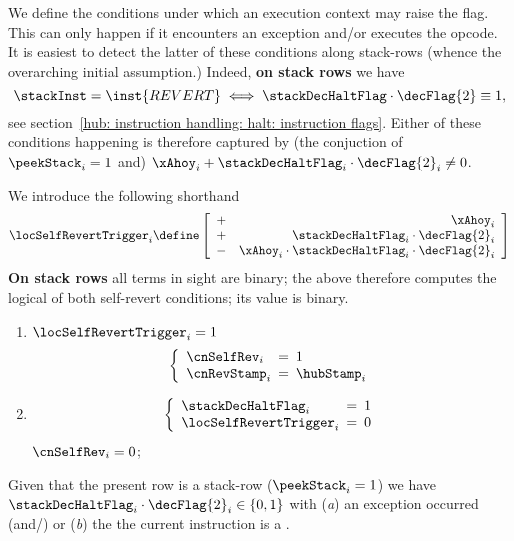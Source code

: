 \begin{center}
\end{center}
We define the conditions under which an execution context may raise the \cnSelfRev{} flag.
This can only happen if it encounters an exception and/or executes the  opcode.
It is easiest to detect the latter of these conditions along stack-rows (whence the overarching initial assumption.)
Indeed, \textbf{on stack rows} we have
\[
	\stackInst = \inst{REVERT} \iff \stackDecHaltFlag \cdot \decFlag{2} \equiv 1,
\]
see section~\ref{hub: instruction handling: halt: instruction flags}.
Either of these conditions happening is therefore captured by (the conjuction of $\peekStack _{i} = 1$ and) $\xAhoy _{i} + \stackDecHaltFlag _{i} \cdot \decFlag{2} _{i} \neq 0$.

We introduce the following shorthand
\[
	\locSelfRevertTrigger _{i}
	\define
	\left[ \begin{array}{cr}
		+ & \xAhoy            _{i}                                                     \\
		+ & \stackDecHaltFlag _{i} \cdot \decFlag{2}       _{i}                        \\
		- & \xAhoy            _{i} \cdot \stackDecHaltFlag _{i} \cdot \decFlag{2} _{i} \\
	\end{array} \right]
\]
\saNote{}
\textbf{On stack rows} all terms in sight are binary; the above therefore computes the logical \OR{} of both self-revert conditions; its value is binary.
\begin{enumerate}
	\item \If $\locSelfRevertTrigger _{i} = 1$ \Then
		\[
			\left\{ \begin{array}{lcl}
				\cnSelfRev  _{i} & \!\!\! = \!\!\! & 1              \\
				\cnRevStamp _{i} & \!\!\! = \!\!\! & \hubStamp _{i} \\
			\end{array} \right.
		\]
	\item \If 
		\[
			\left\{ \begin{array}{lclr}
				\stackDecHaltFlag     _{i} & \!\!\! = \!\!\! & 1 \\
				\locSelfRevertTrigger _{i} & \!\!\! = \!\!\! & 0 \\
			\end{array} \right.
		\]
		\Then $\cnSelfRev _{i} = 0$;
\end{enumerate}
\saNote{}
Given that the present row is a stack-row ($\peekStack _{i} = 1$) we have $\stackDecHaltFlag _{i} \cdot \decFlag{2} _{i} \in \{0, 1\}$ with 
(\emph{a}) an exception occurred (and/) or
(\emph{b}) the the current instruction is a .
